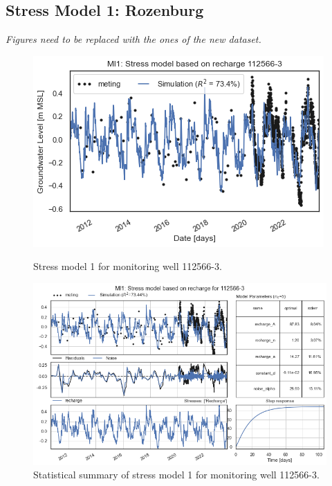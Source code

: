 \subsection{Stress Model 1: Rozenburg}
\textit{Figures need to be replaced with the ones of the new dataset.}
\begin{figure}[htbp]
    \centering
    \begin{minipage}{0.32\textwidth}
        \centering
        \includegraphics[width=\linewidth]{figures/results/ml1 112566-3.png}
        \caption{Stress model 1 for monitoring well 112566-3.}
        \label{fig:112565-3}
    \end{minipage}
    \hfill
    \begin{minipage}{0.32\textwidth}
        \centering
        \includegraphics[width=\linewidth]{figures/results/ml1 112566-3 (2).png}
        \caption{Statistical summary of stress model 1 for monitoring well 112566-3.}
        \label{fig:112565-3}

\end{minipage}
\end{figure}
